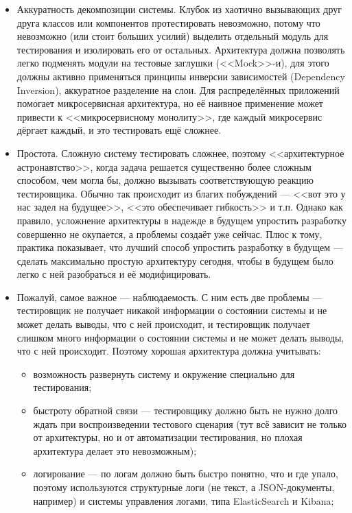 \documentclass{../../text-style}
\begin{document}
\begin{itemize}
    \item Аккуратность декомпозиции системы. Клубок из хаотично вызывающих друг друга классов или компонентов протестировать невозможно, потому что невозможно (или стоит больших усилий) выделить отдельный модуль для тестирования и изолировать его от остальных. Архитектура должна позволять легко подменять модули на тестовые заглушки (<<Mock>>-и), для этого должны активно применяться принципы инверсии зависимостей (Dependency Inversion), аккуратное разделение на слои. Для распределённых приложений помогает микросервисная архитектура, но её наивное применение может привести к <<микросервисному монолиту>>, где каждый микросервис дёргает каждый, и это тестировать ещё сложнее.
    \item Простота. Сложную систему тестировать сложнее, поэтому <<архитектурное астронавтство>>, когда задача решается существенно более сложным способом, чем могла бы, должно вызывать соответствующую реакцию тестировщика. Обычно так происходит из благих побуждений --- <<вот это у нас задел на будущее>>, <<это обеспечивает гибкость>> и т.п. Однако как правило, усложнение архитектуры в надежде в будущем упростить разработку совершенно не окупается, а проблемы создаёт уже сейчас. Плюс к тому, практика показывает, что лучший способ упростить разработку в будущем --- сделать максимально простую архитектуру сегодня, чтобы в будущем было легко с ней разобраться и её модифицировать.
    \item Пожалуй, самое важное --- наблюдаемость. С  ним есть две проблемы --- тестировщик не получает никакой информации о состоянии системы и не может делать выводы, что с ней происходит, и тестировщик получает слишком много информации о состоянии системы и не может делать выводы, что с ней происходит. Поэтому хорошая архитектура должна учитывать:
    \begin{itemize}
        \item возможность развернуть систему и окружение специально для тестирования;
        \item быстроту обратной связи --- тестировщику должно быть не нужно долго ждать при воспроизведении тестового сценария (тут всё зависит не только от архитектуры, но и от автоматизации тестирования, но плохая архитектура делает это невозможным);
        \item логирование --- по логам должно быть быстро понятно, что и где упало, поэтому используются структурные логи (не текст, а JSON-документы, например) и системы управления логами, типа ElasticSearch и Kibana;

\end{itemize}
\end{itemize}
\end{document}
